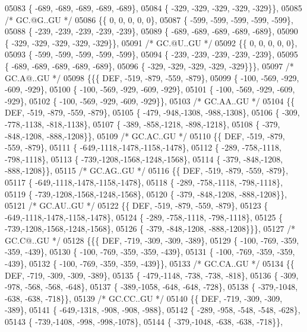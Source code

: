\begin{DoxyCode}
05083 \{ -689, -689, -689, -689, -689\},
05084 \{ -329, -329, -329, -329, -329\}\},
05085 \textcolor{comment}{/* GC.@G..GU */}
05086 \{\{    0,    0,    0,    0,    0\},
05087 \{ -599, -599, -599, -599, -599\},
05088 \{ -239, -239, -239, -239, -239\},
05089 \{ -689, -689, -689, -689, -689\},
05090 \{ -329, -329, -329, -329, -329\}\},
05091 \textcolor{comment}{/* GC.@U..GU */}
05092 \{\{    0,    0,    0,    0,    0\},
05093 \{ -599, -599, -599, -599, -599\},
05094 \{ -239, -239, -239, -239, -239\},
05095 \{ -689, -689, -689, -689, -689\},
05096 \{ -329, -329, -329, -329, -329\}\}\},
05097 \textcolor{comment}{/* GC.A@..GU */}
05098 \{\{\{  DEF, -519, -879, -559, -879\},
05099 \{ -100, -569, -929, -609, -929\},
05100 \{ -100, -569, -929, -609, -929\},
05101 \{ -100, -569, -929, -609, -929\},
05102 \{ -100, -569, -929, -609, -929\}\},
05103 \textcolor{comment}{/* GC.AA..GU */}
05104 \{\{  DEF, -519, -879, -559, -879\},
05105 \{ -479, -948,-1308, -988,-1308\},
05106 \{ -309, -778,-1138, -818,-1138\},
05107 \{ -389, -858,-1218, -898,-1218\},
05108 \{ -379, -848,-1208, -888,-1208\}\},
05109 \textcolor{comment}{/* GC.AC..GU */}
05110 \{\{  DEF, -519, -879, -559, -879\},
05111 \{ -649,-1118,-1478,-1158,-1478\},
05112 \{ -289, -758,-1118, -798,-1118\},
05113 \{ -739,-1208,-1568,-1248,-1568\},
05114 \{ -379, -848,-1208, -888,-1208\}\},
05115 \textcolor{comment}{/* GC.AG..GU */}
05116 \{\{  DEF, -519, -879, -559, -879\},
05117 \{ -649,-1118,-1478,-1158,-1478\},
05118 \{ -289, -758,-1118, -798,-1118\},
05119 \{ -739,-1208,-1568,-1248,-1568\},
05120 \{ -379, -848,-1208, -888,-1208\}\},
05121 \textcolor{comment}{/* GC.AU..GU */}
05122 \{\{  DEF, -519, -879, -559, -879\},
05123 \{ -649,-1118,-1478,-1158,-1478\},
05124 \{ -289, -758,-1118, -798,-1118\},
05125 \{ -739,-1208,-1568,-1248,-1568\},
05126 \{ -379, -848,-1208, -888,-1208\}\}\},
05127 \textcolor{comment}{/* GC.C@..GU */}
05128 \{\{\{  DEF, -719, -309, -309, -389\},
05129 \{ -100, -769, -359, -359, -439\},
05130 \{ -100, -769, -359, -359, -439\},
05131 \{ -100, -769, -359, -359, -439\},
05132 \{ -100, -769, -359, -359, -439\}\},
05133 \textcolor{comment}{/* GC.CA..GU */}
05134 \{\{  DEF, -719, -309, -309, -389\},
05135 \{ -479,-1148, -738, -738, -818\},
05136 \{ -309, -978, -568, -568, -648\},
05137 \{ -389,-1058, -648, -648, -728\},
05138 \{ -379,-1048, -638, -638, -718\}\},
05139 \textcolor{comment}{/* GC.CC..GU */}
05140 \{\{  DEF, -719, -309, -309, -389\},
05141 \{ -649,-1318, -908, -908, -988\},
05142 \{ -289, -958, -548, -548, -628\},
05143 \{ -739,-1408, -998, -998,-1078\},
05144 \{ -379,-1048, -638, -638, -718\}\},

\end{DoxyCode}

